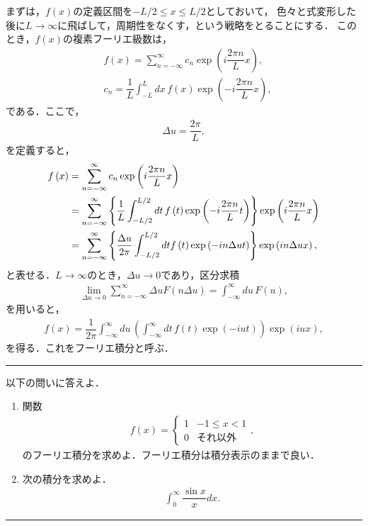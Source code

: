 まずは，$f(x)$の定義区間を$-L/2\leq x \leq L/2$としておいて，
色々と式変形した後に$L\to \infty$に飛ばして，周期性をなくす，という戦略をとることにする．
このとき，$f(x)$の複素フーリエ級数は，
\begin{align}
  &f\left(x\right) = \sum_{n=-\infty}^{\infty}c_n \exp\left(i\dfrac{2\pi n}{L}x\right), \\
  &c_n = \dfrac{1}{L}\int_{-L}^{L}dx\,f\left(x\right)\exp\left(-i\dfrac{2\pi n}{L}x\right),
\end{align}
である．ここで，
\begin{align}
  \Delta u = \dfrac{2\pi}{L},
\end{align}
を定義すると，
\begin{align}
 f\left(x\right) &= \sum_{n=-\infty}^{\infty}c_n \exp\left(i\dfrac{2\pi n}{L}x\right) \notag \\
                 &= \sum_{n=-\infty}^{\infty}\left\{\dfrac{1}{L}\int_{-L/2}^{L/2}dt\, f\left(t\right)
                             \exp\left(-i\dfrac{2\pi n}{L}t\right)\right\}\exp\left(i\dfrac{2\pi n}{L}x\right) \notag \\
                 &= \sum_{n=-\infty}^{\infty}\left\{\dfrac{\Delta u}{2\pi}\int_{-L/2}^{L/2}dt 
                        f\left(t\right)\exp\left(-in\Delta u t\right)\right\}\exp\left(in\Delta u x\right),
\end{align}
と表せる．$L\to \infty$のとき，$\Delta u \to 0$であり，区分求積
\begin{align}
 \lim_{\Delta u\to 0} \sum_{n=-\infty}^{\infty}\Delta u F\left(n\Delta u\right) = \int_{-\infty}^{\infty}du\,F\left(u\right),
\end{align}
を用いると，
\begin{align}
 f\left(x\right) = \dfrac{1}{2\pi}\int_{-\infty}^{\infty}du\,
                   \left(\int_{-\infty}^{\infty}dt\,f\left(t\right)\exp\left(-iut\right)\right)\exp\left(iux\right), 
\end{align}
を得る．これをフーリエ積分と呼ぶ．
%
\newpage
%
\hrule
\reidai
以下の問いに答えよ．
\begin{enumerate}[(1)]
  \item 関数
	\begin{align}
	  f\left(x\right) =
	  \begin{cases}
	    1 & -1\leq x < 1 \\
	    0 & それ以外
	  \end{cases},
	\end{align}
	のフーリエ積分を求めよ．フーリエ積分は積分表示のままで良い．
  \item 次の積分を求めよ．
	\begin{align}
	  \int_0^{\infty}\dfrac{\sin x}{x}dx. 
	\end{align}
\end{enumerate}
\hrule

